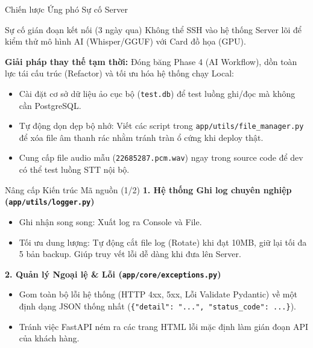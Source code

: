 \begin{frame}{Chiến lược Ứng phó Sự cố Server}
    \begin{block}{Sự cố gián đoạn kết nối (3 ngày qua)}
        Không thể SSH vào hệ thống Server lõi để kiểm thử mô hình AI (Whisper/GGUF) với Card đồ họa (GPU).
    \end{block}
    
    \vspace{0.2cm}
    \textbf{Giải pháp thay thế tạm thời:} Đóng băng Phase 4 (AI Workflow), dồn toàn lực tái cấu trúc (Refactor) và tối ưu hóa hệ thống chạy Local:
    \begin{itemize}
        \item Cài đặt cơ sở dữ liệu ảo cục bộ (\texttt{test.db}) để test luồng ghi/đọc mà không cần PostgreSQL.
        \item Tự động dọn dẹp bộ nhớ: Viết các script trong \texttt{app/utils/file\_manager.py} để xóa file âm thanh rác nhằm tránh tràn ổ cứng khi deploy thật.
        \item Cung cấp file audio mẫu (\texttt{22685287.pcm.wav}) ngay trong source code để dev có thể test luồng STT nội bộ.
    \end{itemize}
\end{frame}

\begin{frame}{Nâng cấp Kiến trúc Mã nguồn (1/2)}
    \textbf{1. Hệ thống Ghi log chuyên nghiệp (\texttt{app/utils/logger.py})}
    \begin{itemize}
        \item Ghi nhận song song: Xuất log ra Console và File.
        \item Tối ưu dung lượng: Tự động cắt file log (Rotate) khi đạt 10MB, giữ lại tối đa 5 bản backup. Giúp truy vết lỗi dễ dàng khi đưa lên Server.
    \end{itemize}
    
    \vspace{0.2cm}
    \textbf{2. Quản lý Ngoại lệ \& Lỗi (\texttt{app/core/exceptions.py})}
    \begin{itemize}
        \item Gom toàn bộ lỗi hệ thống (HTTP 4xx, 5xx, Lỗi Validate Pydantic) về một định dạng JSON thống nhất (\texttt{\{"detail": "...", "status\_code": ...\}}).
        \item Tránh việc FastAPI ném ra các trang HTML lỗi mặc định làm gián đoạn API của khách hàng.
    \end{itemize}
\end{frame}

